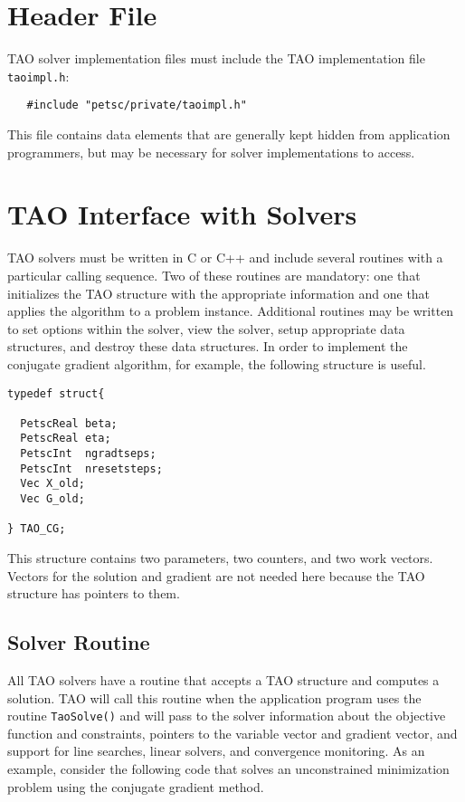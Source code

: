 \section{Header File}
TAO solver implementation files must include the TAO implementation file \texttt{taoimpl.h}:
\begin{verbatim}
   #include "petsc/private/taoimpl.h"
\end{verbatim}
This file contains data elements that are generally kept hidden from application
programmers, but may be necessary for solver implementations to access.
\noindent


\section{TAO Interface with Solvers}
TAO solvers must be written in C or C++ and include several routines with
a particular calling sequence.  Two of these routines are mandatory:
one that initializes the TAO structure with the appropriate information
and one that applies the algorithm to a problem instance.
Additional routines may be written to set options within the
solver, view the solver, setup appropriate data structures, and destroy
these data structures. In order to implement the conjugate
gradient algorithm, for example, the following structure is
useful.
\begin{verbatim}
typedef struct{

  PetscReal beta;
  PetscReal eta;
  PetscInt  ngradtseps;
  PetscInt  nresetsteps;
  Vec X_old;
  Vec G_old; 

} TAO_CG;
\end{verbatim}
This structure contains two parameters, two counters, and two work vectors.
Vectors
for the solution and gradient are not needed here because the TAO
structure has pointers to them.


\subsection{Solver Routine}
All TAO solvers have a routine that accepts a TAO structure and
computes a solution.  
TAO will call this routine when the application
program uses the routine {\tt TaoSolve()} and will pass to the solver
information
about the objective function and constraints, pointers to the
variable vector and gradient vector, and support for line searches,
linear solvers, and convergence monitoring.  As an example, consider
the following code that solves an unconstrained minimization problem
using the conjugate gradient method.

